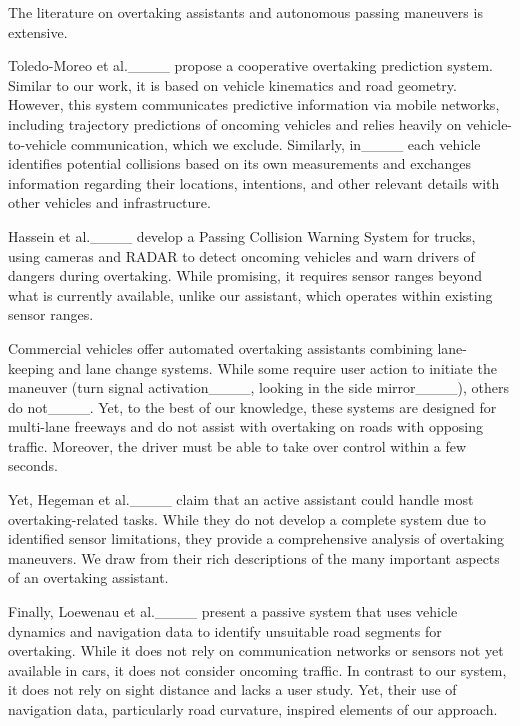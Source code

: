 	The literature on overtaking assistants and autonomous passing maneuvers is extensive.
	
	Toledo-Moreo et al.____ propose a cooperative overtaking prediction system. 
	Similar to our work, it is based on vehicle kinematics and road geometry. 
	However, this system communicates predictive information via mobile networks, including trajectory predictions of oncoming vehicles and relies heavily on vehicle-to-vehicle communication, which we exclude.
	Similarly, in____ each vehicle identifies potential collisions based on its own measurements and exchanges information regarding their locations, intentions, and other relevant details with other vehicles and infrastructure. 
	
	
	Hassein et al.____ develop a Passing Collision Warning System for trucks, using cameras and RADAR to detect oncoming vehicles and warn drivers of dangers during overtaking. 
	While promising, it requires sensor ranges beyond what is currently available, unlike our assistant, which operates within existing sensor ranges.
	
	
	
	
	Commercial vehicles offer automated overtaking assistants combining lane-keeping and lane change systems. 
	While some require user action to initiate the maneuver (turn signal activation____, %
    looking in the side mirror____), %
    others do not____. %
	Yet, to the best of our knowledge, these systems are designed for multi-lane freeways and do not assist with overtaking on roads with opposing traffic.
	Moreover, the driver must be able to take over control within a few seconds.
	


Yet, Hegeman et al.____ claim that an active assistant could handle most overtaking-related tasks. 
While they do not develop a complete system due to identified sensor limitations, they provide a comprehensive analysis of overtaking maneuvers.
We draw from their rich descriptions of the many important aspects of an overtaking assistant. 



Finally, Loewenau et al.____ present a passive system that uses vehicle dynamics and navigation data to identify unsuitable road segments for overtaking. 
While it does not rely on communication networks or sensors not yet available in cars, it does not consider oncoming traffic.
In contrast to our system, it does not rely on sight distance and lacks a user study. 
Yet, their use of navigation data, particularly road curvature, inspired elements of our approach.


